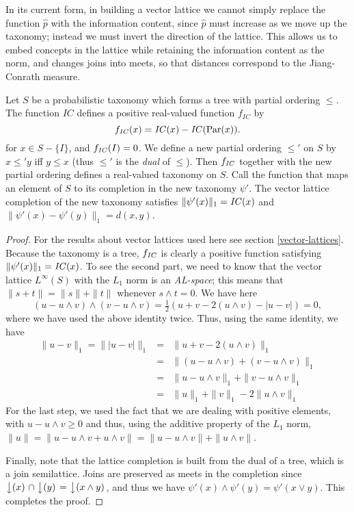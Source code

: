 In its current form, in building a vector lattice we cannot simply replace the function $\hat{p}$ with the information content, since $\hat{p}$ must increase as we move up the taxonomy; instead we must invert the direction of the lattice. This allows us to embed concepts in the lattice while retaining the information content as the norm, and changes joins into meets, so that distances correspond to the Jiang-Conrath measure.
\begin{prop}
Let $S$ be a probabilistic taxonomy which forms a tree with partial ordering $\le$. The function $\mathit{IC}$ defines a positive real-valued function $f_\mathit{IC}$ by
$$f_{\mathit{IC}}(x) = \mathit{IC}(x) - \mathit{IC}(\mathrm{Par}(x)).$$
for $x \in S - \{I\}$, and $f_{\mathit{IC}}(I) = 0$. We define a new partial ordering $\le'$ on $S$ by $x \le' y$ iff $y \le x$ (thus $\le'$ is the \emph{dual} of $\le$). Then $f_{\mathit{IC}}$ together with the new partial ordering defines a real-valued taxonomy on $S$. Call the function that maps an element of $S$ to its completion in the new taxonomy $\psi'$. The vector lattice completion of the new taxonomy satisfies $\|\psi'(x)\|_1 = \mathit{IC}(x)$ and $\|\psi'(x) - \psi'(y)\|_1 = d(x,y)$. 
\end{prop}

\begin{proof}
For the results about vector lattices used here see section \ref{vector-lattices}. Because the taxonomy is a tree, $f_{\mathit{IC}}$ is clearly a positive function satisfying $\|\psi'(x)\|_1 = \mathit{IC}(x)$. To see the second part, we need to know that the vector lattice $L^\infty(S)$ with the $L_1$ norm is an \emph{AL-space}; this means that $\|s + t\| = \|s\| + \|t\|$ whenever $s \land t = 0$. We have here
$$(u - u\land v)\land (v - u\land v)  = \tfrac{1}{2}(u + v - 2(u\land v) - |u - v|) = 0,$$
where we have used the above identity twice. Thus, using the same identity, we have
\begin{eqnarray*}
 \|u - v\|_1 = \| |u - v| \|_1&=& \|u + v - 2(u \land v)\|_1\\
		&=& \|(u - u\land v) + (v - u \land v)\|_1\\
		&=& \|u - u\land v \|_1 + \|v - u \land v \|_1\\
		&=& \|u\|_1 + \|v\|_1 -2\|u\land v\|_1
\end{eqnarray*}
For the last step, we used the fact that we are dealing with positive elements, with $u - u\land v \ge 0$ and thus, using the additive property of the $L_1$ norm, $\|u\| = \|u - u\land v + u\land v\| = \|u - u\land v\| + \|u\land v\|$.

Finally, note that the lattice completion is built from the dual of a tree, which is a join semilattice. Joins are preserved as meets in the completion since $\left\downarrow(x)\right. \cap \left\downarrow(y)\right. = \left\downarrow(x \land y)\right.$, and thus we have $\psi'(x) \land \psi'(y) = \psi'(x\lor y)$. This completes the proof.
\end{proof}

